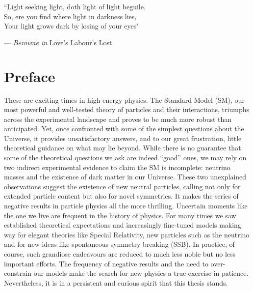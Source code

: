 \documentclass[openany,twoside,frontopenright,openright]{ip3thesis}
\begin{document}
\begin{epigraph*}
``Light seeking light, doth light of light beguile. \\So, ere you find where light in darkness lies, \\ Your light grows dark by losing of your eyes"

\flushright --- \emph{Berowne in} Love's Labour's Lost
\end{epigraph*} 


\chapter*{Preface}

These are exciting times in high-energy physics. The Standard Model (SM), our most powerful and well-tested theory of particles and their interactions, triumphs across the experimental landscape and proves to be much more robust than anticipated. Yet, once confronted with some of the simplest questions about the Universe, it provides unsatisfactory answers, and to our great frustration, little theoretical guidance on what may lie beyond. While there is no guarantee that some of the theoretical questions we ask are indeed ``good'' ones, we may rely on two indirect experimental evidence to claim the SM is incomplete: neutrino masses and the existence of dark matter in our Universe. These two unexplained observations suggest the existence of new neutral particles, calling not only for extended particle content but also for novel symmetries. It makes the series of negative results in particle physics all the more thrilling. Uncertain moments like the one we live are frequent in the history of physics. For many times we saw established theoretical expectations and increasingly fine-tuned models making way for elegant theories like Special Relativity, new particles such as the neutrino and for new ideas like spontaneous symmetry breaking (SSB). In practice, of course, such grandiose endeavours are reduced to much less noble but no less important efforts. The frequency of negative results and the need to over-constrain our models make the search for new physics a true exercise in patience. Nevertheless, it is in a persistent and curious spirit that this thesis stands.
\end{document}
